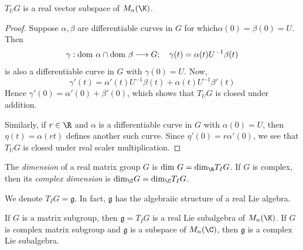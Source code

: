 \begin{proposition}
  \(T_UG\) is a real vector subspace of \(M_n(\K)\).
\end{proposition}

\begin{proof}
  Suppose \(\alpha,\beta\) are differentiable curves in \(G\) for which\(\alpha(0)=\beta(0)=U\).
  Then
  \[ \gamma:\text{dom }\alpha\cap\text{dom }\beta\longrightarrow G;\hspace{10px}\gamma(t)=\alpha(t)U^{-1}\beta(t) \]
  is also a differentiable curve in \(G\) with \(\gamma(0)=U\). Now,
  \[ \gamma'(t)=\alpha'(t)U^{-1}\beta(t)+\alpha(t)U^{-1}\beta'(t) \]
  Hence \(\gamma'(0)=\alpha'(0)+\beta'(0)\), which shows that \(T_UG\) is closed under addition.

  Similarly, if \(r\in\R\) and \(\alpha\) is a differentiable curve in \(G\) with \(\alpha(0)=U\),
  then \(\eta(t)=\alpha(rt)\) defines another such curve. Since \(\eta'(0)=r\alpha'(0)\),
  we see that \(T_UG\) is closed under real scaler multiplication.
\end{proof}

\begin{definition}
  The {\it dimension} of a real matrix group \(G\) is \(\text{dim }G=\text{dim}_{\R}T_IG\).
  If \(G\) is complex, then its {\it complex dimension} is \(\text{dim}_{\C}G=\text{dim}_{\C}T_IG\).
\end{definition}

We denote \(T_IG=\mathfrak{g}\). In fact, \(\mathfrak{g}\) has the algebraiic structure of a
real Lie algebra.

\begin{theorem}
  If \(G\) is a matrix subgroup, then \(\mathfrak{g}=T_IG\) is a real Lie subalgebra of
  \(M_n(\K)\). If \(G\) is complex matrix subgroup and \(\mathfrak{g}\) is a subspace of \(M_n(\C)\),
  then \(\mathfrak{g}\) is a complex Lie subalgebra.
  \label{thm:lie}
\end{theorem}

